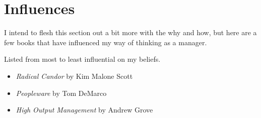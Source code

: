 \documentclass[11pt]{amsart}
\begin{document}
\section{Influences}

I intend to flesh this section out a bit more with the why and how, but here are a few books that have influenced my way of thinking as a manager.

Listed from most to least influential on my beliefs.

\begin{itemize}
  \item \emph{Radical Candor} by Kim Malone Scott 
  \item \emph{Peopleware} by Tom DeMarco
  \item \emph{High Output Management} by Andrew Grove
\end{itemize}
\end{document}
